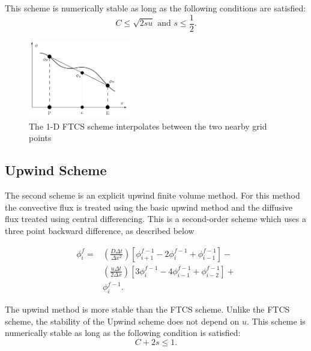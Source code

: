 \documentclass[twocolumn,10pt]{asme2ej}
\begin{document}
\noindent This scheme is numerically stable as long as the following conditions are satisfied:
\begin{equation}
\label{FTCS_stability}
C \leq \sqrt{2su} \mbox{ and } s \leq \frac{1}{2}.
\end{equation}

\begin{figure}[t]
\begin{center}
\includegraphics[width=0.4\textwidth]{figure/FTCS.png}
\caption{The 1-D FTCS scheme interpolates between the two nearby grid points}
\label{FTCS_scheme}
\end{center}
\end{figure}

\subsection{Upwind Scheme}
The second scheme is an explicit upwind finite volume method. For this method the convective flux is treated using the basic upwind method and the diffusive flux treated using central differencing. This is a second-order scheme which uses a three point backward difference, as described below

\begin{equation}
\label{upwind_eqn}
\begin{split}
\phi_i ^f = & \left( \frac{D \Delta t}{\Delta x^2} \right) \left[ \phi_{i+1} ^{f-1} - 2 \phi_{i} ^{f-1} + \phi_{i-1} ^{f-1} \right] - \\
            & \left( \frac{u \Delta t}{2 \Delta x} \right) \left[ 3 \phi_{i} ^{f-1} - 4 \phi_{i-1} ^{f-1} + \phi_{i-2} ^{f-1} \right] + \\
            & \phi_i ^{f-1}.
\end{split}
\end{equation}

\noindent The upwind method is more stable than the FTCS scheme. Unlike the FTCS scheme, the stability of the Upwind scheme does not depend on $u$. This scheme is numerically stable as long as the following condition is satisfied:
\begin{equation}
\label{Upwind_stability}
C + 2s \leq 1.
\end{equation}
\end{document}
